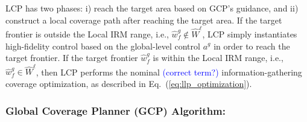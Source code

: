 \documentclass[letterpaper]{article} %
\newcommand{\phdone}[1]{} %
\begin{document}
LCP has two phases: i) reach the target area based on GCP's guidance, and ii) construct a local coverage path after reaching the target area.
If the target frontier is outside the Local IRM range, i.e., $\hat{w}^g_f \notin \hat{W}^\ell$, LCP simply instantiates high-fidelity control  based on the global-level control $a^g$ in order to reach the target frontier.
If the target frontier $\hat{w}^g_f$ is within the Local IRM range, i.e., $\hat{w}^g_f \in \hat{W}^\ell$, then LCP performs the nominal \textcolor{blue}{(correct term?)} information-gathering coverage optimization, as described in Eq.~(\ref{eq:llp_optimization}).


\subsubsection{Global Coverage Planner (GCP) Algorithm:}\label{sssec:GCP} \hfill
\vspace{-0.25pt}
\end{document}
